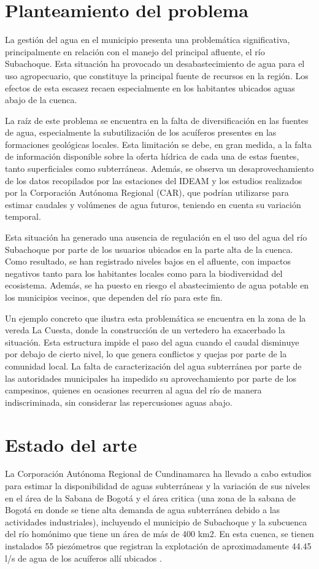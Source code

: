 \documentclass[draft]{agujournal2019}
\begin{document}
\section{Planteamiento del problema}
La gestión del agua en el municipio presenta una problemática significativa, principalmente en relación con el manejo del principal afluente, el río Subachoque. Esta situación ha provocado un desabastecimiento de agua para el uso agropecuario, que constituye la principal fuente de recursos en la región. Los efectos de esta escasez recaen especialmente en los habitantes ubicados aguas abajo de la cuenca.

La raíz de este problema se encuentra en la falta de diversificación en las fuentes de agua, especialmente la subutilización de los acuíferos presentes en las formaciones geológicas locales. Esta limitación se debe, en gran medida, a la falta de información disponible sobre la oferta hídrica de cada una de estas fuentes, tanto superficiales como subterráneas. Además, se observa un desaprovechamiento de los datos recopilados por las estaciones del IDEAM y los estudios realizados por la Corporación Autónoma Regional (CAR), que podrían utilizarse para estimar caudales y volúmenes de agua futuros, teniendo en cuenta su variación temporal.

Esta situación ha generado una ausencia de regulación en el uso del agua del río Subachoque por parte de los usuarios ubicados en la parte alta de la cuenca. Como resultado, se han registrado niveles bajos en el afluente, con impactos negativos tanto para los habitantes locales como para la biodiversidad del ecosistema. Además, se ha puesto en riesgo el abastecimiento de agua potable en los municipios vecinos, que dependen del río para este fin.

Un ejemplo concreto que ilustra esta problemática se encuentra en la zona de la vereda La Cuesta, donde la construcción de un vertedero ha exacerbado la situación. Esta estructura impide el paso del agua cuando el caudal disminuye por debajo de cierto nivel, lo que genera conflictos y quejas por parte de la comunidad local. La falta de caracterización del agua subterránea por parte de las autoridades municipales ha impedido su aprovechamiento por parte de los campesinos, quienes en ocasiones recurren al agua del río de manera indiscriminada, sin considerar las repercusiones aguas abajo.

\section{Estado del arte}
La Corporación Autónoma Regional de Cundinamarca ha llevado a cabo estudios para estimar la disponibilidad de aguas subterráneas y la variación de sus niveles en el área de la Sabana de Bogotá y el área critica (una zona de la sabana de Bogotá en donde se tiene alta demanda de agua subterránea debido a las actividades industriales), incluyendo el municipio de Subachoque y la subcuenca del río homónimo que tiene un área de más de 400 km2. En esta cuenca, se tienen instalados 55 piezómetros que registran la explotación de aproximadamente 44.45 l/s de agua de los acuíferos allí ubicados \cite{CAR1} .
\end{document}
